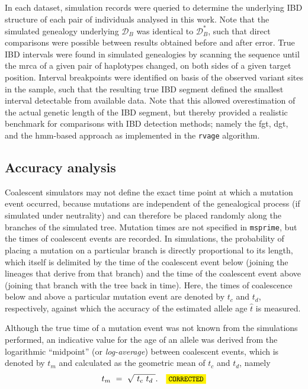 In each dataset, simulation records were queried to determine the underlying IBD structure of each pair of individuals analysed in this work.
Note that the simulated genealogy underlying $\mathcal{D}_B$ was identical to $\mathcal{D}_B^{\ast}$, such that direct comparisons were possible between results obtained before and after error.
True IBD intervals were found in simulated genealogies by scanning the sequence until the \gls{mrca} of a given pair of haplotypes changed, on both sides of a given target position.
Interval breakpoints were identified on basis of the observed variant sites in the sample, such that the resulting true IBD segment defined the smallest interval detectable from available data.
Note that this allowed overestimation of the actual genetic length of the IBD segment, but thereby provided a realistic benchmark for comparisons with IBD detection methods; namely the \gls{fgt}, \gls{dgt}, and the \gls{hmm}-based approach as implemented in the \texttt{rvage} algorithm.


%
\subsection{Accuracy analysis}
%

Coalescent simulators may not define the exact time point at which a mutation event occurred, because mutations are independent of the genealogical process (if simulated under neutrality) and can therefore be placed randomly along the branches of the simulated tree.
Mutation times are not specified in \texttt{msprime}, but the times of coalescent events are recorded.
In simulations, the probability of placing a mutation on a particular branch is directly proportional to its length, which itself is delimited by the time of the coalescent event below (joining the lineages that derive from that branch) and the time of the coalescent event above (joining that branch with the tree back in time).
Here, the times of coalescence below and above a particular mutation event are denoted by $t_c$ and $t_d$, respectively, against which the accuracy of the estimated allele age $\hat{t}$ is measured.

Although the true time of a mutation event was not known from the simulations performed, an indicative value for the age of an allele was derived from the logarithmic ``midpoint'' (or \emph{log-average}) between coalescent events, which is denoted by $t_m$ and calculated as the geometric mean of $t_c$ and $t_d$, namely
\begin{equation}
	t_m~=~\sqrt{~t_c ~ t_d~}\text{.}\CorrectLabel
\end{equation}

